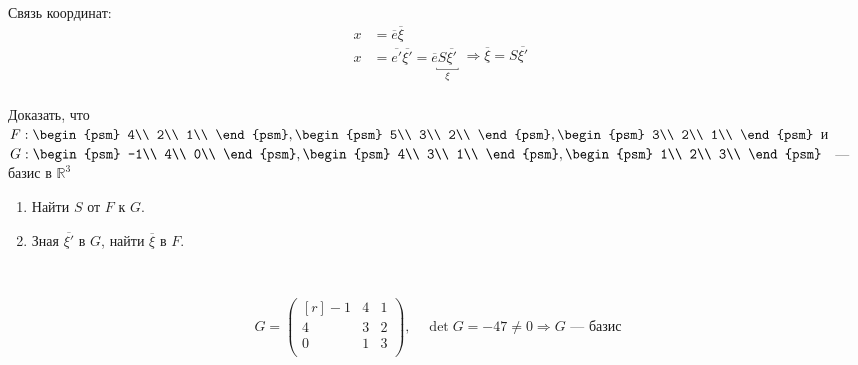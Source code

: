 Связь координат:
\begin{equation*}
\left.
\begin{aligned}
x&=\overline{e} \overline{\xi}\\
x&=\overline{e'}\overline{\xi'}=\overline{e}\underbracket{S\overline{\xi'}}_{\xi}\\
\end{aligned} 
\right. \Rightarrow \boxed{\overline{\xi} =S\overline{\xi'}}
\end{equation*}
\vspace{3mm}
\begin{prim}	
	Доказать, что $F:\begin{psm}
	4\\
	2\\
	1\\
	\end{psm},\begin{psm}
	5\\
	3\\
	2\\
	\end{psm},\begin{psm}
	3\\
	2\\
	1\\
	\end{psm}$ и $G:\begin{psm}
	-1\\
	4\\
	0\\
	\end{psm},\begin{psm}
	4\\
	3\\
	1\\
	\end{psm},\begin{psm}
	1\\
	2\\
	3\\
	\end{psm}$ ~---~ базис в $\mathbb{R}^3$
	\begin{enumerate}
		\item Найти $S$ от $F$ к $G$.
		\item Зная $\overline{\xi'}$ в $G$, найти $\overline{\xi}$ в $F$.
	\end{enumerate}
~
\end{prim}
$$G = \begin{pmatrix*}[r]
-1 & 4 & 1\\
4 & 3 & 2\\
0 & 1 & 3\\
\end{pmatrix*},\quad \det G =-47 \neq 0 \Rightarrow G \text{ --- базис}$$
